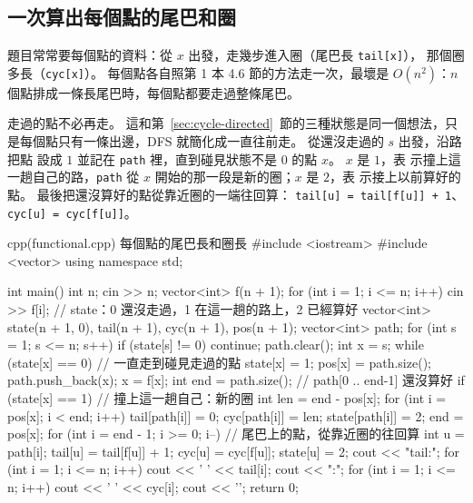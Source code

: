 \subsection{一次算出每個點的尾巴和圈}

題目常常要每個點的資料：從 $x$ 出發，走幾步進入圈（尾巴長 \texttt{tail[x]}），
那個圈多長（\texttt{cyc[x]}）。 每個點各自照第 1 本 4.6 節的方法走一次，最壞是
$O(n^2)$：$n$ 個點排成一條長尾巴時，每個點都要走過整條尾巴。

走過的點不必再走。 這和第~\ref{sec:cycle-directed}~節的三種狀態是同一個想法，只
是每個點只有一條出邊，DFS 就簡化成一直往前走。 從還沒走過的 $s$ 出發，沿路把點
設成 $1$ 並記在 \texttt{path} 裡，直到碰見狀態不是 $0$ 的點 $x$。 $x$ 是 $1$，表
示撞上這一趟自己的路，\texttt{path} 從 $x$ 開始的那一段是新的圈；$x$ 是 $2$，表
示接上以前算好的點。 最後把還沒算好的點從靠近圈的一端往回算：
\texttt{tail[u] = tail[f[u]] + 1}、\texttt{cyc[u] = cyc[f[u]]}。

\begin{example}[label=ex:functional]{cpp}{(functional.cpp) 每個點的尾巴長和圈長}
#include <iostream>
#include <vector>
using namespace std;

int main() {
    int n;
    cin >> n;
    vector<int> f(n + 1);
    for (int i = 1; i <= n; i++) {
        cin >> f[i];
    }
    // state：0 還沒走過，1 在這一趟的路上，2 已經算好
    vector<int> state(n + 1, 0), tail(n + 1), cyc(n + 1), pos(n + 1);
    vector<int> path;
    for (int s = 1; s <= n; s++) {
        if (state[s] != 0) {
            continue;
        }
        path.clear();
        int x = s;
        while (state[x] == 0) {            // 一直走到碰見走過的點
            state[x] = 1;
            pos[x] = path.size();
            path.push_back(x);
            x = f[x];
        }
        int end = path.size();             // path[0 .. end-1] 還沒算好
        if (state[x] == 1) {               // 撞上這一趟自己：新的圈
            int len = end - pos[x];
            for (int i = pos[x]; i < end; i++) {
                tail[path[i]] = 0;
                cyc[path[i]] = len;
                state[path[i]] = 2;
            }
            end = pos[x];
        }
        for (int i = end - 1; i >= 0; i--) {   // 尾巴上的點，從靠近圈的往回算
            int u = path[i];
            tail[u] = tail[f[u]] + 1;
            cyc[u] = cyc[f[u]];
            state[u] = 2;
        }
    }
    cout << "tail:";
    for (int i = 1; i <= n; i++) {
        cout << ' ' << tail[i];
    }
    cout << "\ncycle:";
    for (int i = 1; i <= n; i++) {
        cout << ' ' << cyc[i];
    }
    cout << '\n';
    return 0;
}
\end{example}


